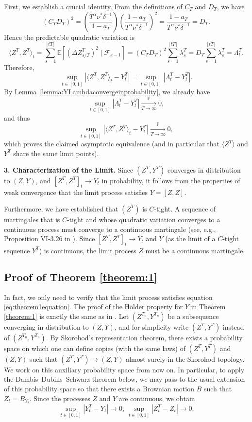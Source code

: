 \documentclass[letterpaper]{article}
\numberwithin{equation}{section}
\theoremstyle{definition}
\theoremstyle{remark}
\begin{document}
First, we establish a crucial identity. From the definitions of $C_T$ and $D_T$, we have
\[
    (C_T D_T)^2
    =\left(\frac{T^\alpha \nu^*\delta^{-1}}{1-a_T}\right)\left(\frac{1-a_T}{T^\alpha \nu^*\delta^{-1}}\right)^2
    =\frac{1-a_T}{T^\alpha \nu^*\delta^{-1}}
    =D_T.
\]
Hence the predictable quadratic variation is
\[
\langle Z^T, Z^T \rangle_t
=\sum_{s=1}^{\lfloor tT\rfloor}\mathbb E\!\left[(\Delta Z_{s/T}^T)^2\mid\mathcal F_{s-1}\right]
=(C_TD_T)^2\sum_{s=1}^{\lfloor tT\rfloor}\lambda_s^T
=D_T\sum_{s=1}^{\lfloor tT\rfloor}\lambda_s^T
=\Lambda_t^T.
\]
Therefore,
\[
\sup_{t\in[0,1]}\left|\langle Z^T, Z^T \rangle_t-Y_t^T\right|
=\sup_{t\in[0,1]}\left|\Lambda_t^T-Y_t^T\right|.
\]
By Lemma~\ref{lemma:YLambdaconvergeinprobability}, we already have
\[
\sup_{t\in[0,1]}\left|\Lambda_t^T-Y_t^T\right|\xrightarrow[T\to\infty]{\mathbb P}0,
\]
and thus
\[
\sup_{t\in[0,1]}\left|\langle Z^T, Z^T \rangle_t-Y_t^T\right|\xrightarrow[T\to\infty]{\mathbb P}0,
\]
which proves the claimed asymptotic equivalence (and in particular that $\langle Z^T\rangle$ and $Y^T$
share the same limit points).

\textbf{3. Characterization of the Limit.}
Since $(Z^T, Y^T)$ converges in distribution to $(Z,Y)$, and $[Z^T, Z^T]_t \to Y_t$ in probability, it follows from the properties of weak convergence that the limit process satisfies $Y=[Z,Z]$.

Furthermore, we have established that $(Z^T)$ is $C$-tight. A sequence of martingales that is $C$-tight and whose quadratic variation converges to a continuous process must converge to a continuous martingale (see, e.g., Proposition VI-3.26 in \cite{jacod2013limit}). Since $[Z^T,Z^T]_t \to Y_t$ and $Y$ (as the limit of a $C$-tight sequence $Y^T$) is continuous, the limit process $Z$ must be a continuous martingale.


\subsection{Proof of Theorem \ref{theorem:1}}
\label{subsec:proofoftheorem1}

In fact, we only need to verify that the limit process satisfies equation \eqref{eq:theorem1equation}. The proof of the H\"older property for $Y$ in Theorem \ref{theorem:1} is exactly the same as in \cite{jaisson2016rough}. {Let $(Z^{T_n}, Y^{T_n})$ be a subsequence converging in distribution to $(Z,Y)$, and for simplicity write $(Z^T,Y^T)$ instead of $(Z^{T_n},Y^{T_n})$. By Skorohod's representation theorem, there exists a probability space on which one can define copies (with the same laws) of $(Z^T,Y^T)$ and $(Z,Y)$ such that $(Z^T,Y^T)\to(Z,Y)$ almost surely in the Skorohod topology. We work on this auxiliary probability space from now on. In particular, to apply the Dambis--Dubins--Schwarz theorem below, we may pass to the usual extension of this probability space so that there exists a Brownian motion $B$ such that $Z_t = B_{Y_t}$.}
Since the processes $Z$ and $Y$ are continuous, we obtain 
\[
  \sup_{t\in[0,1]}|Y_t^T-Y_t|\rightarrow 0,\ \sup_{t\in[0,1]}|Z_t^T-Z_t|\rightarrow 0.
\]
\end{document}
